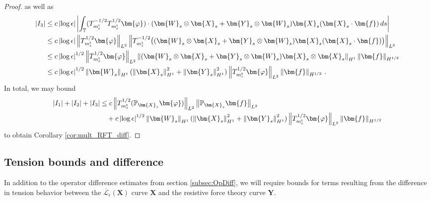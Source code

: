 \documentclass[11pt,reqno]{amsart}
\newcommand{\T}{\mathbb{T}}
\renewcommand{\P}{\mathbb{P}}
\newcommand{\X}{\bm{X}}
\newcommand{\Y}{\bm{Y}}
\newcommand{\abs}[1]{\left\lvert #1 \right\rvert}
\newcommand{\norm}[1]{\left\lVert #1 \right\rVert}
\newcommand{\mc}[1]{\mathcal{#1}}
\numberwithin{equation}{section}
\theoremstyle{definition}
\begin{document}
\begin{proof}
as well as 
\begin{equation}
\begin{aligned}
  \abs{I_3} &\le c\abs{\log\epsilon}\abs{\int_\T (T_{m_\epsilon^{\rm t}}^{-1/2}T_{m_\epsilon^{\rm t}}^{1/2}\bm{\varphi})\cdot(\bm{W}_s\otimes\X_s+\Y_s\otimes\bm{W}_s)\X_s(\X_s\cdot\bm{f})\,ds} \\
  &\le c\abs{\log\epsilon}\norm{T_{m_\epsilon^{\rm t}}^{1/2}\bm{\varphi}}_{L^2}\norm{T_{m_\epsilon^{\rm t}}^{-1/2}\big((\bm{W}_s\otimes\X_s+\Y_s\otimes\bm{W}_s)\X_s(\X_s\cdot\bm{f})\big)}_{L^2}\\
  &\le c\abs{\log\epsilon}^{1/2}\norm{T_{m_\epsilon^{\rm t}}^{1/2}\bm{\varphi}}_{L^2}\norm{(\bm{W}_s\otimes\X_s+\Y_s\otimes\bm{W}_s)\X_s\otimes\X_s}_{H^1}\norm{\bm{f}}_{H^{1/2}}\\
  &\le c\abs{\log\epsilon}^{1/2}\norm{\bm{W}_s}_{H^1}(\norm{\X_s}_{H^1}^2+\norm{\Y_s}_{H^1}^2)\norm{T_{m_\epsilon^{\rm t}}^{1/2}\bm{\varphi}}_{L^2}\norm{\bm{f}}_{H^{1/2}}\,.
\end{aligned}
\end{equation}
%
%
In total, we may bound 
\begin{equation}
\begin{aligned}
  \abs{I_1}+\abs{I_2}+\abs{I_3} &\le c\norm{T_{m_\epsilon^{\rm t}}^{1/2}(\P_{\X_s}\bm{\varphi})}_{L^2}\norm{\P_{\X_s}\bm{f}}_{L^2}\\
  &\quad + c\abs{\log\epsilon}^{1/2}\norm{\bm{W}_s}_{H^1}(\norm{\X_s}_{H^1}^2+\norm{\Y_s}_{H^1}^2)\norm{T_{m_\epsilon^{\rm t}}^{1/2}\bm{\varphi}}_{L^2}\norm{\bm{f}}_{H^{1/2}}
\end{aligned}
\end{equation}
to obtain Corollary \ref{cor:mult_RFT_diff}.
%
\end{proof}



\subsection{Tension bounds and difference}\label{subsec:tauXYDiff}
In addition to the operator difference estimates from section \ref{subsec:OpDiff}, we will require bounds for terms resulting from the difference in tension behavior between the $\overline{\mc{L}}_\epsilon(\X)$ curve $\X$ and the resistive force theory curve $\Y$. 
\end{document}
